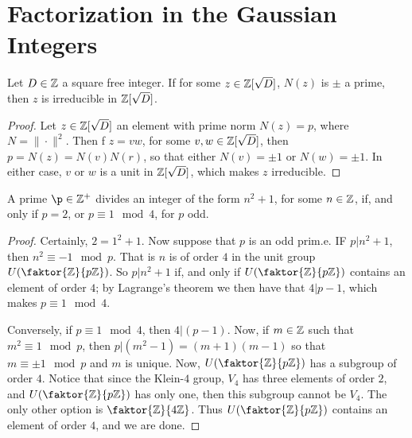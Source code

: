 \section{Factorization in the Gaussian Integers}
\label{section_6.4}

\begin{lemma}\label{lemma_6.4.1}
  Let $D \in \mathbb{Z}$ a square free integer. If for some $z \in \mathbb{Z}[\sqrt{D}]$,
  $N(z)$ is $\pm$ a prime, then  $z$ is irreducible in
  $\mathbb{Z}[\sqrt{D}]$.
\end{lemma}
\begin{proof}
  Let $z \in \mathbb{Z}[\sqrt{D}]$ an element with prime norm $N(z)=p$, where
  $N=\|\cdot\|^2$. Then f  $z=vw$, for some  $v,w \in \mathbb{Z}[\sqrt{D}]$, then
  $p=N(z)=N(v)N(r)$, so that either $N(v)=\pm 1$ or $N(w)=\pm 1$. In either
  case, $v$ or  $w$ is a unit in  $\mathbb{Z}[\sqrt{D}]$, which makes $z$ irreducible.
\end{proof}

\begin{lemma}\label{lemma_6.4.2}
  A prime $\p \in \Z^+$ divides an integer of the form  $n^2+1$, for some  $n
  \in \mathbb{Z}$, if, and only if  $p=2$, or  $p \equiv 1 \mod{4}$, for $p$ odd.
\end{lemma}
\begin{proof}
  Certainly, $2=1^2+1$. Now suppose that  $p$ is an odd prim.e. IF  $p|n^2+1$,
  then  $n^2 \equiv -1 \mod{p}$. That is $n$ is of order $4$ in the unit group
  $U(\faktor{\Z}{p\Z})$. So $p|n^2+1$ if, and only if  $U(\faktor{\Z}{p\Z})$
  contains an element of order $4$; by Lagrange's theorem we then have that
  $4|p-1$, which makes $p \equiv 1 \mod{4}$.

  Conversely, if $p \equiv 1 \mod{4}$, then $4|(p-1)$. Now, if $m \in \mathbb{Z}$ such
  that  $m^2 \equiv 1 \mod{p}$, then $p|(m^2-1)=(m+1)(m-1)$ so that $m \equiv
  \pm 1 \mod{p}$ and $m$ is unique. Now,  $U(\faktor{\Z}{p\Z})$ has a subgroup
  of order $4$. Notice that since the Klein-$4$ group, $V_4$ has three elements
  of order $2$, and  $U(\faktor{\Z}{p\Z})$ has only one, then this subgroup
  cannot be $V_4$. The only other option is $\faktor{\Z}{4\Z}$. Thus
  $U(\faktor{\Z}{p\Z})$ contains an element of order $4$, and we are done.
\end{proof}


